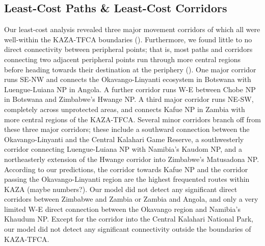 \documentclass[abstract=on,10pt,a4paper,bibliography=totocnumbered]{article}
\begin{document}
\subsection{Least-Cost Paths \& Least-Cost Corridors}
Our least-cost analysis revealed three major movement corridors of which all
were well-within the KAZA-TFCA boundaries (). Furthermore, we
found little to no direct connectivity between peripheral points; that is, most
paths and corridors connecting two adjacent peripheral points run through more
central regions before heading towards their destination at the periphery
(). One major corridor runs SE-NW and connects the
Okavango-Linyanti ecosystem in Botswana with Luengue-Luiana NP in Angola. A
further corridor runs W-E between Chobe NP in Botswana and Zimbabwe's Hwange NP.
A third major corridor runs NE-SW, completely across unprotected areas, and
connects Kafue NP in Zambia with more central regions of the KAZA-TFCA. Several
minor corridors branch off from these three major corridors; these include a
southward connection between the Okavango-Linyanti and the Central Kalahari Game
Reserve, a southwesterly corridor connecting Luengue-Luiana NP with Namibia's
Kaudom NP, and a northeasterly extension of the Hwange corridor into Zimbabwe's
Matusadona NP. According to our predictions, the corridor towards Kafue NP and
the corridor passing the Okavango-Linyanti region are the highest frequented
routes within KAZA (maybe numbers?). Our model did not detect any significant
direct corridors between Zimbabwe and Zambia or Zambia and Angola, and only a
very limited W-E direct connection between the Okavango region and Namibia's
Khaudum NP. Except for the corridor into the Central Kalahari National Park, our
model did not detect any significant connectivity outside the boundaries of
KAZA-TFCA.
\end{document}
